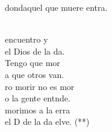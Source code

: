 \documentclass[12pt]{article}
\begin{document}
\begin{multicols*}{2}
\begin{cancion}
            dondaquel que muere entra.\\\jump\\
            \begin{chorus}%
             encuentro y\\
             el Dios de la da.\\
            Tengo que mor\\
            a que otros van.\\
            ro morir no es mor\\
            o la gente entnde.\\
            morimos a la erra\\
            el D de la da elve. (**)\\
            \end{chorus}%
            \jump\\
        \end{cancion}%
        

\end{multicols*}
\end{document}
